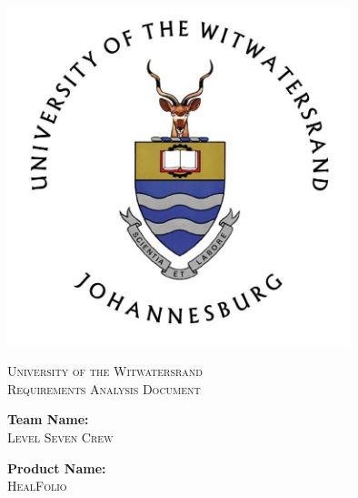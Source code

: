 \documentclass[a4paper]{article}
\begin{document}
\begin{titlepage}

\centering

\vfill

\includegraphics[width=10cm]{Wits-logo1.jpg}

\vskip 0.1cm

\center 

\textsc{\LARGE University of the Witwatersrand}\\[0.5cm] 

\textsc{\Large Requirements Analysis Document} \\[0.5cm] 

\begin{minipage}{0.4\textwidth}

\begin{center} \large

\textbf{Team Name:} \\[0.3cm]

\textsc{Level Seven Crew} \\[0.3cm]

\end{center}

\begin{center} \large

\textbf{Product Name:} \\[0.3cm]

\textsc{HealFolio} \\[0.3cm]

\end{center}

\begin{flushleft} \large


\end{flushleft}
\end{minipage}
\end{titlepage}
\end{document}

